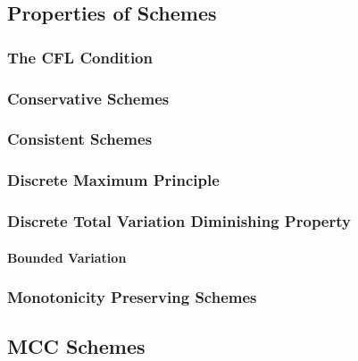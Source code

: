\documentclass[
  fourColumns,
  landscape
]{formularyETH/formularyETH}
\begin{document}
  \subsection{Properties of Schemes}\label{subsec:properties_of_schemes}
    \subsubsection{The CFL Condition}\label{subsubsec:cfl_condition}
      
    \subsubsection{Conservative Schemes}\label{subsec:conservative_schemes}
      
    \subsubsection{Consistent Schemes}\label{subsec:consistent_schemes}
      
    \subsubsection{Discrete Maximum Principle}\label{subsec:discrete_maximum_principle}
      
    \subsubsection{Discrete Total Variation Diminishing Property}\label{subsec:total_variation_diminishing}
      
      \paragraph{Bounded Variation}
      
      \label{subsubsec:hartens_lemma}
      
    \subsubsection{Monotonicity Preserving Schemes}\label{subsec:monotonicity_preserving_schemes}
      
      \label{subsubsubsec:monotone_finite_volume_methods}
        
    \subsection{MCC Schemes}\label{subsubsubsec:mcc_schemes}
      
      
      \newpage
{}
\end{document}
